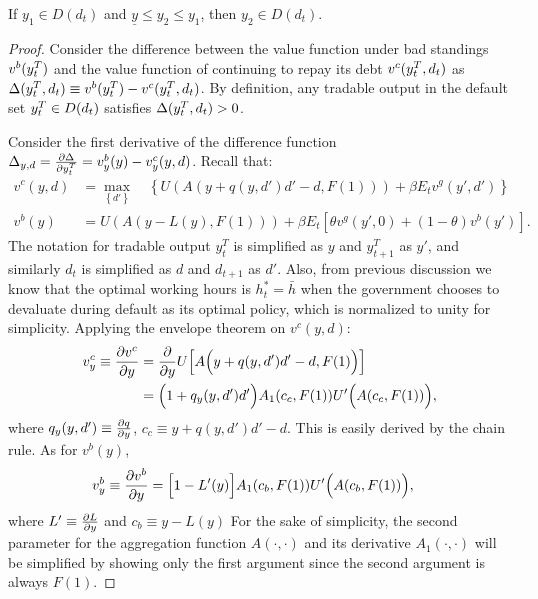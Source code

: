 \begin{proposition}
    \label{prop2}
    If $y_1 \in D(d_t)$ and $\underline{y}\le y_2 \le y_1$, then $y_2 \in D(d_t)$.
\end{proposition}
\begin{proof}
    Consider the difference between the value function under bad standings $v^b(y^T_{t})$ and the value function of continuing to repay its debt  $v^c(y^T_{t}, d_t)$ as $\Delta(y^T_{t}, d_t) \equiv v^b(y^T_{t}) - v^c(y^T_{t}, d_t)$. By definition, any tradable output in the default set $y^T_{t} \in D(d_t)$ satisfies $\Delta(y^T_{t}, d_t) >0$.

    Consider the first derivative of the difference function $\Delta_{y, d} = \pdv{\Delta}{y^T_t} = v^b_{y}(y) - v^c_{y}(y, d)$.
    Recall that:
    \begin{align*}
        v^c(y, d) &= \max_{\left\{d' \right\}} \quad
        \left\{
            U\left(
                A\left( y + q(y, d')d' - d, F(1)\right)
             \right)
             + \beta E_t
             v^g \left(
                y', d'
              \right)
         \right\}\\
        v^b(y) &=
            U\left(
                A\left( y - L(y), F(1)\right)
             \right)
             + \beta E_t \left[
                \theta v^g \left(
                    y', 0
                \right)
                + (1-\theta) v^b \left(
                    y'
                 \right)
            \right].
    \end{align*}
    The notation for tradable output $y^T_t$ is simplified as $y$ and $y^T_{t+1}$ as $y'$, and similarly $d_t$ is simplified as $d$ and $d_{t+1}$ as $d'$. Also, from previous discussion we know that the optimal working hours is $h^*_t = \bar{h}$ when the government chooses to devaluate during default as its optimal policy, which is normalized to unity for simplicity. Applying the envelope theorem on $v^c(y, d)$:
    \begin{align*}
        v^c_y \equiv \pdv{v^c}{y} &= \pdv{}{y} U\Big[ A\Big(y + q(y, d')d' - d, F(1)\Big)\Big]\\
        &=\Big(1 + q_y(y, d')d'\Big) A_1(c_c, F(1)) U'\Big(A(c_c, F(1))\Big),
    \end{align*}
    where $q_y(y, d') \equiv \pdv{q}{y}$, $c_c \equiv y + q(y, d')d' -d$. This is easily derived by the chain rule. As for $v^b(y)$,
    \begin{align*}
        v^b_y \equiv \pdv{v^b}{y} &=
        \Big[ 1 - L' (y)\Big] A_1 (c_b, F(1)) U' \Bigl(A(c_b, F(1))\Bigr),
    \end{align*}
    where $L' \equiv \pdv{L}{y}$ and $c_b \equiv y - L(y)$
    For the sake of simplicity, the second parameter for the aggregation function $A(\cdot, \cdot)$ and its derivative $A_1(\cdot,\cdot )$ will be simplified by showing only the first argument since the second argument is always $F(1)$.


\end{proof}

